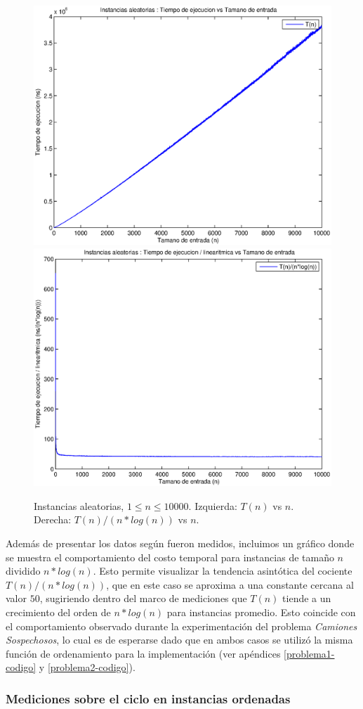 \begin{center}
  \begin{figure}[H]
    \includegraphics[width=0.5\linewidth]{problema2/graficos/problema2_aleatoria_10000.eps}
    \includegraphics[width=0.5\linewidth]{problema2/graficos/problema2_aleatoria_10000_div_nlogn.eps}
    \caption{Instancias aleatorias, $1 \leq n \leq 10000$. Izquierda: $T(n)$ vs $n$. Derecha: $T(n) / (n * log(n))$ vs $n$.}
    \label{fig:problema2-aleatoria-10000}
  \end{figure}
\end{center}

Además de presentar los datos según fueron medidos, incluimos un gráfico donde se muestra el comportamiento del costo temporal para instancias de tamaño $n$ dividido $n * log(n)$. Esto permite visualizar la tendencia asintótica del cociente $T(n) / (n * log(n))$, que en este caso se aproxima a una constante cercana al valor $50$, sugiriendo dentro del marco de mediciones que $T(n)$ tiende a un crecimiento del orden de $n * log(n)$ para instancias promedio. Esto coincide con el comportamiento observado durante la experimentación del problema \emph{Camiones Sospechosos}, lo cual es de esperarse dado que en ambos casos se utilizó la misma función de ordenamiento para la implementación (ver apéndices \ref{problema1-codigo} y \ref{problema2-codigo}).

\subsubsection{Mediciones sobre el ciclo en instancias ordenadas}

